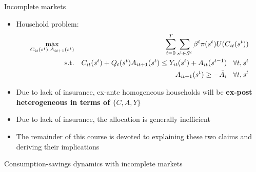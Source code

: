 \documentclass[9pt]{beamer}
\newcommand{\bit}{\begin{itemize}}
\newcommand{\eit}{\end{itemize}}
\begin{document}
\begin{frame}{Incomplete markets}

\bit
\setlength\itemsep{1em}

\item Household problem:
\begin{eqnarray}
\max_{C_{it}(s^t), A_{it+1}(s^t)} && \sum_{t=0}^{T} \sum_{s^t \in S^t} \beta^t \pi (s^t) U(C_{it}(s^t)) \nonumber \\
\text{s.t.} && 	C_{it}(s^t) + Q_t(s^t) A_{it+1}(s^t)  \leq Y_{it}(s^t) + A_{it}(s^{t-1}) \hspace{3mm} \forall t, s^{t}\nonumber \\
&& A_{it+1}(s^t) \geq - \bar A_i \hspace{3mm} \forall t, s^{t}\nonumber
\end{eqnarray}

\item Due to lack of insurance, ex-ante homogeneous households will be \bf ex-post heterogeneous \normalfont in terms of $\{C,A,Y\}$

\item Due to lack of insurance, the allocation is generally inefficient

\item The remainder of this course is devoted to explaining these two claims and deriving their implications

\eit

\end{frame}


\begin{frame}

\begin{center}
	\huge Consumption-savings dynamics with incomplete markets \normalfont
\end{center}

\end{frame}
\end{document}
